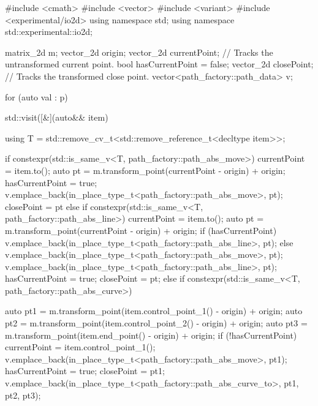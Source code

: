 \begin{codeblock}
  #include <cmath>
  #include <vector>
  #include <variant>
  #include <experimental/io2d>
  using namespace std;
  using namespace std::experimental::io2d;
  
  matrix_2d m;
  vector_2d origin;
  vector_2d currentPoint; // Tracks the untransformed current point.
  bool hasCurrentPoint = false;
  vector_2d closePoint;   // Tracks the transformed close point.
  vector<path_factory::path_data> v;
  
  for (auto val : p) {
    std::visit([&](auto&& item) {
      using T = std::remove_cv_t<std::remove_reference_t<decltype item>>;

      if constexpr(std::is_same_v<T, path_factory::path_abs_move>) {
        currentPoint = item.to();
        auto pt = m.transform_point(currentPoint - origin) + origin;
        hasCurrentPoint = true;
        v.emplace_back(in_place_type_t<path_factory::path_abs_move>, pt);
        closePoint = pt
      }
      else if constexpr(std::is_same_v<T, path_factory::path_abs_line>) {
        currentPoint = item.to();
        auto pt = m.transform_point(currentPoint - origin) + origin;
        if (hasCurrentPoint) {
          v.emplace_back(in_place_type_t<path_factory::path_abs_line>, pt);
        }
        else {
          v.emplace_back(in_place_type_t<path_factory::path_abs_move>, pt);
          v.emplace_back(in_place_type_t<path_factory::path_abs_line>, pt);
          hasCurrentPoint = true;
          closePoint = pt;
        }
      }
      else if constexpr(std::is_same_v<T, path_factory::path_abs_curve>) {
        auto pt1 = m.transform_point(item.control_point_1() - origin) + origin;
        auto pt2 = m.transform_point(item.control_point_2() - origin) + origin;
        auto pt3 = m.transform_point(item.end_point() - origin) + origin;
        if (!hasCurrentPoint) {
          currentPoint = item.control_point_1();
          v.emplace_back(in_place_type_t<path_factory::path_abs_move>, pt1);
          hasCurrentPoint = true;
          closePoint = pt1;
        }
        v.emplace_back(in_place_type_t<path_factory::path_abs_curve_to>, pt1,
          pt2, pt3);
 
}}}
\end{codeblock}
